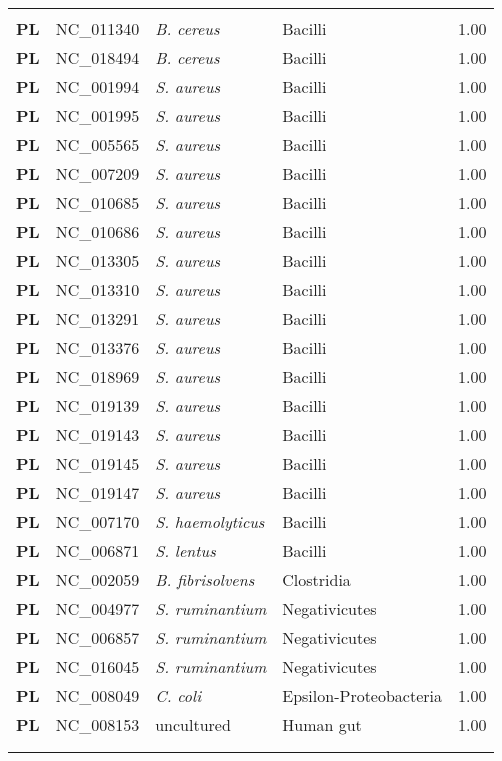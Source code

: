 \begin{adjustwidth}{-3cm}{2cm}
{\begin{supertabular}{>{\bfseries}l|p{0.1\textwidth}p{0.14\textwidth}l|l}
\hline\\
PL & NC\_011340 & \textit{B. cereus} & Bacilli & 1.00\\
PL & NC\_018494 & \textit{B. cereus} & Bacilli & 1.00\\
PL & NC\_001994 & \textit{S. aureus} & Bacilli & 1.00\\
PL & NC\_001995 & \textit{S. aureus} & Bacilli & 1.00\\
PL & NC\_005565 & \textit{S. aureus} & Bacilli & 1.00\\
PL & NC\_007209 & \textit{S. aureus} & Bacilli & 1.00\\
PL & NC\_010685 & \textit{S. aureus} & Bacilli & 1.00\\
PL & NC\_010686 & \textit{S. aureus} & Bacilli & 1.00\\
PL & NC\_013305 & \textit{S. aureus} & Bacilli & 1.00\\
PL & NC\_013310 & \textit{S. aureus} & Bacilli & 1.00\\
PL & NC\_013291 & \textit{S. aureus} & Bacilli & 1.00\\
PL & NC\_013376 & \textit{S. aureus} & Bacilli & 1.00\\
PL & NC\_018969 & \textit{S. aureus} & Bacilli & 1.00\\
PL & NC\_019139 & \textit{S. aureus} & Bacilli & 1.00\\
PL & NC\_019143 & \textit{S. aureus} & Bacilli & 1.00\\
PL & NC\_019145 & \textit{S. aureus} & Bacilli & 1.00\\
PL & NC\_019147 & \textit{S. aureus} & Bacilli & 1.00\\
PL & NC\_007170 & \textit{S. haemolyticus} & Bacilli & 1.00\\
PL & NC\_006871 & \textit{S. lentus} & Bacilli & 1.00\\
PL & NC\_002059 & \textit{B. fibrisolvens} & Clostridia & 1.00\\
PL & NC\_004977 & \textit{S. ruminantium} & Negativicutes & 1.00\\
PL & NC\_006857 & \textit{S. ruminantium} & Negativicutes & 1.00\\
PL & NC\_016045 & \textit{S. ruminantium} & Negativicutes & 1.00\\
PL & NC\_008049 & \textit{C. coli} & Epsilon-Proteobacteria & 1.00\\
PL & NC\_008153 & uncultured & Human gut & 1.00\\
\\
\\

\end{supertabular}}
\end{adjustwidth}
